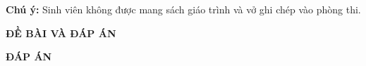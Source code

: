 \documentclass[12pt]{article}
\begin{document}
\thispagestyle{empty}
\lamtieude
\vspace*{1cm}


\indebai
\begin{enumerate}[]
\foreachproblem[dttuluan]{\item\causo\thisproblem}
\end{enumerate}

\vspace*{1cm}
{\bf Chú ý:} Sinh viên không được mang sách giáo trình và vở ghi chép vào phòng thi.


\newpage
\setcounter{page}{1}
\lamtieude
\indebailoigiai
\begin{center}
{\bf ĐỀ BÀI VÀ ĐÁP ÁN }
\end{center}
\begin{enumerate}[]
\foreachproblem[dttuluan]{\item\causo\thisproblem}
\end{enumerate}

\newpage
\setcounter{page}{1}
\lamtieude
\indapanloigiai
\begin{center}
{\bf ĐÁP ÁN }
\end{center}

\begin{enumerate}[]
\foreachproblem[dttuluan]{\item\causo\thisproblem}
\end{enumerate}
\end{document}
